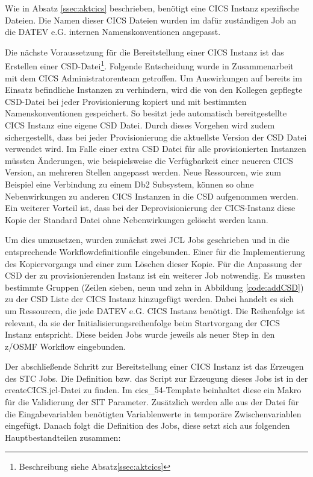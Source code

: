 Wie in Absatz \ref{ssec:aktcics} beschrieben, benötigt eine CICS Instanz spezifische Dateien.
Die Namen dieser CICS Dateien wurden im dafür zuständigen Job an die DATEV e.G. internen Namenskonventionen angepasst.

Die nächste Voraussetzung für die Bereitstellung einer CICS Instanz ist das Erstellen einer CSD-Datei\footnote{Beschreibung siehe Absatz\ref{ssec:aktcics}}.
Folgende Entscheidung wurde in Zusammenarbeit mit dem CICS Administratorenteam getroffen.
Um Auswirkungen auf bereits im Einsatz befindliche Instanzen zu verhindern, wird die von den Kollegen gepflegte CSD-Datei bei jeder Provisionierung kopiert und mit bestimmten Namenskonventionen gespeichert.
So besitzt jede automatisch bereitgestellte CICS Instanz eine eigene CSD Datei.
Durch dieses Vorgehen wird zudem sichergestellt, dass bei jeder Provisionierung die aktuellste Version der CSD Datei verwendet wird.
Im Falle einer extra CSD Datei für alle provisionierten Instanzen müssten Änderungen, wie beispielsweise die Verfügbarkeit einer neueren CICS Version, an mehreren Stellen angepasst werden.
Neue Ressourcen, wie zum Beispiel eine Verbindung zu einem Db2 Subsystem, können so ohne Nebenwirkungen zu anderen CICS Instanzen in die CSD aufgenommen werden.
Ein weiterer Vorteil ist, dass bei der Deprovisionierung der CICS-Instanz diese Kopie der Standard Datei ohne Nebenwirkungen gelöscht werden kann.

Um dies umzusetzen, wurden zunächst zwei JCL Jobs geschrieben und in die entsprechende Workflowdefinitionfile eingebunden.
Einer für die Implementierung des Kopiervorgangs und einer zum Löschen dieser Kopie.
Für die Anpassung der CSD der zu provisionierenden Instanz ist ein weiterer Job notwendig.
Es mussten bestimmte Gruppen (Zeilen sieben, neun und zehn in Abbildung \ref{code:addCSD}) zu der CSD Liste der CICS Instanz hinzugefügt werden.
Dabei handelt es sich um Ressourcen, die jede DATEV e.G. CICS Instanz benötigt.
Die Reihenfolge ist relevant, da sie der Initialisierungsreihenfolge beim Startvorgang der CICS Instanz entspricht.
Diese beiden Jobs wurde jeweils als neuer Step in den z/OSMF Workflow eingebunden.

\begin{minipage}{\linewidth}

\end{minipage}

Der abschließende Schritt zur Bereitstellung einer CICS Instanz ist das Erzeugen des STC Jobs.
Die Definition bzw. das Script zur Erzeugung dieses Jobs ist in der \glqq createCICS.jcl\grqq-Datei zu finden.
Im \glqq cics\_54\grqq-Template beinhaltet diese ein Makro für die Validierung der SIT Parameter.
Zusätzlich werden alle aus der Datei für die Eingabevariablen benötigten Variablenwerte in temporäre Zwischenvariablen eingefügt.
Danach folgt die Definition des Jobs, diese setzt sich aus folgenden Hauptbestandteilen zusammen:

